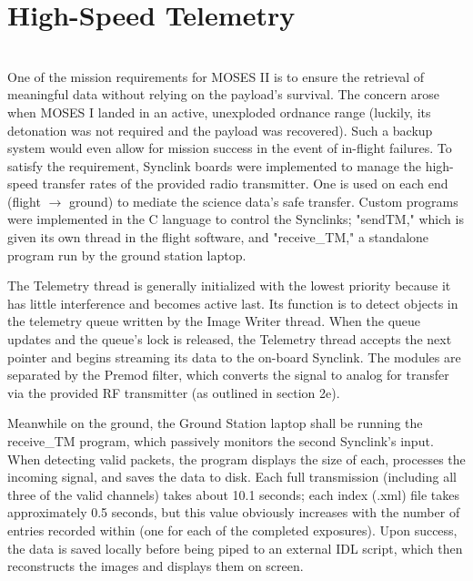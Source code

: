 \section{High-Speed Telemetry}
\hrulefill
\\
One of the mission requirements for MOSES II is to ensure the retrieval of meaningful data without relying on the payload's survival. The concern arose when MOSES I landed in an active, unexploded ordnance range (luckily, its detonation was not required and the payload was recovered). Such a backup system would even allow for mission success in the event of in-flight failures. To satisfy the requirement, Synclink boards were implemented to manage the high-speed transfer rates of the provided radio transmitter. One is used on each end (flight $\rightarrow$ ground) to mediate the science data's safe transfer. Custom programs were implemented in the C language to control the Synclinks; "sendTM," which is given its own thread in the flight software, and "receive_TM," a standalone program run by the ground station laptop.

The Telemetry thread is generally initialized with the lowest priority because it has little interference and becomes active last. Its function is to detect objects in the telemetry queue written by the Image Writer thread. When the queue updates and the queue's lock is released, the Telemetry thread accepts the next pointer and begins streaming its data to the on-board Synclink. The modules are separated by the Premod filter, which converts the signal to analog for transfer via the provided RF transmitter (as outlined in section 2e).

Meanwhile on the ground, the Ground Station laptop shall be running the receive\_TM program, which passively monitors the second Synclink's input. When detecting valid packets, the program displays the size of each, processes the incoming signal, and saves the data to disk. Each full transmission (including all three of the valid channels) takes about 10.1 seconds; each index (.xml) file takes approximately 0.5 seconds, but this value obviously increases with the number of entries recorded within (one for each of the completed exposures). Upon success, the data is saved locally before being piped to an external IDL script, which then reconstructs the images and displays them on screen.

